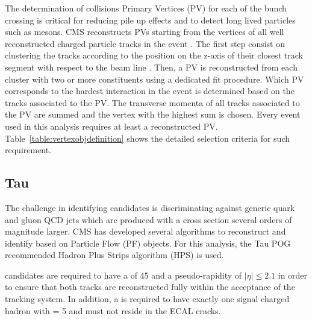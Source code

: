 The determination of collisions Primary Vertices (PV) for each of the bunch crossing is critical for reducing pile up effects and to detect long lived particles such as mesons. CMS reconstructs PVs starting from the vertices of all well reconstructed charged particle tracks in the event \cite{CMS-PAS-TRK-10-005}. The first step consist on clustering the tracks according to the position on the z-axis of their closest track segment with respect to the beam line \cite{CMS-IN-2011-014}. Then, a PV is reconstructed from each cluster with two or more constituents using a dedicated fit procedure. Which PV corresponds to the hardest interaction in the event is determined based on the tracks associated to the PV. The transverse momenta of all tracks associated to the PV are summed and the vertex with the highest sum is chosen. Every event used in this analysis requires at least a reconstructed PV. Table~\ref{table:vertexobjdefinition} shows the detailed selection criteria for such requirement.

\subsection{Tau}
\label{subsec::objsel_tau}


The challenge in identifying \hadtau candidates is discriminating against generic quark and gluon QCD jets which are produced with a cross section several orders of magnitude larger. CMS has developed several algorithms to reconstruct and identify \hadtau based on Particle Flow (PF) objects. For this analysis, the Tau POG recommended Hadron Plus Strips algorithm (HPS) is used. 

\hadtau candidates are required to have a \pt of 45 \gev and a pseudo-rapidity of $|\eta| \le 2.1$ in order to ensure that both tracks are reconstructed fully within the acceptance of the tracking system. In addition, a \hadtau is required to have exactly one signal charged hadron with \pt = 5 \gev and must not reside in the ECAL cracks.

